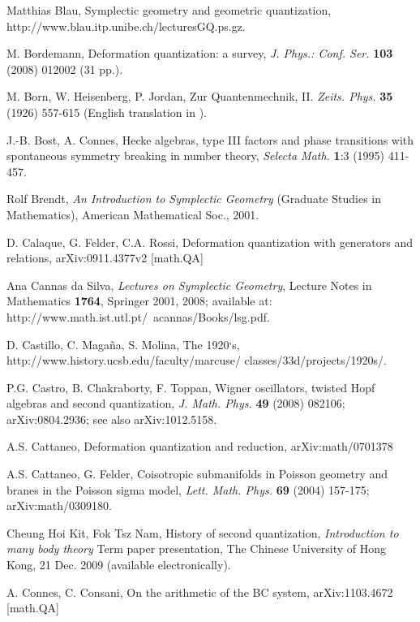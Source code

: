 \documentclass[12pt]{article}
\begin{document}
\begin{thebibliography}{000}
 Matthias Blau, Symplectic geometry and geometric quantization,
http://www.blau.itp.unibe.ch/lecturesGQ.ps.gz.

 M. Bordemann, Deformation quantization: a survey, {\it J. Phys.: Conf. Ser.} {\bf 103} (2008) 012002 (31 pp.).

 M. Born, W. Heisenberg, P. Jordan, Zur Quantenmechnik, II. 
{\it Zeits. Phys.} {\bf 35} (1926) 557-615 (English translation in \cite{SQM}).

 J.-B. Bost, A. Connes, Hecke algebras, type III factors and
phase transitions with spontaneous symmetry breaking in number theory,
{\it Selecta Math.} {\bf 1}:3 (1995) 411-457.

 Rolf Brendt, {\it An Introduction to Symplectic Geometry}
(Graduate Studies in Mathematics), American Mathematical Soc., 2001.

  D. Calaque, G. Felder, C.A. Rossi, Deformation quantization with generators and relations, arXiv:0911.4377v2 [math.QA]  
   
 Ana Cannas da Silva, {\it Lectures on Symplectic Geometry},
Lecture Notes in Mathematics {\bf 1764}, Springer 2001, 2008; available at:\\ http://www.math.ist.utl.pt/~acannas/Books/lsg.pdf.

 D. Castillo, C. Maga\~na, S. Molina, The 1920‘s,  \\
http://www.history.ucsb.edu/faculty/marcuse/ classes/33d/projects/1920s/.

 P.G. Castro, B. Chakraborty, F. Toppan, Wigner oscillators,
twisted Hopf algebras and second quantization, {\it J. Math. Phys.}
{\bf 49} (2008) 082106; arXiv:0804.2936; see also arXiv:1012.5158.

 A.S. Cattaneo, Deformation quantization and reduction, arXiv:math/0701378

 A.S. Cattaneo, G. Felder, Coisotropic submanifolds in Poisson geometry and branes in the Poisson sigma model,
{\it Lett. Math. Phys.} {\bf 69} (2004) 157-175; arXiv:math/0309180. 
  
 Cheung Hoi Kit, Fok Tsz Nam, History of second
quantization, {\it Introduction to many body theory} Term paper presentation,
The Chinese University of Hong Kong, 21 Dec. 2009 (available electronically).

 A. Connes, C. Consani, On the arithmetic of the BC system,
arXiv:1103.4672 [math.QA]


\end{thebibliography}
\end{document}
